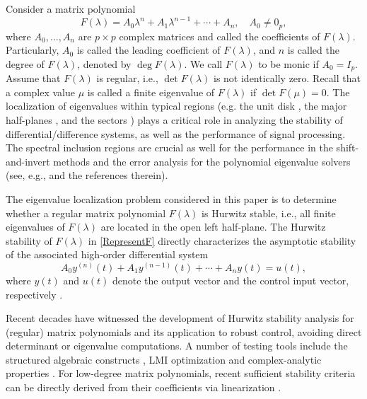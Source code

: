 \documentclass[12pt,reqno]{amsart}
\theoremstyle{plain}
\numberwithin{equation}{section}
\theoremstyle{remark}
\begin{document}
Consider a matrix polynomial 
\begin{equation}\label{RepresentF} 
F(\lambda)=A_{0} \lambda^{n}+A_{1} \lambda^{n-1}+\cdots+A_{n},\quad A_0\neq 0_p,
\end{equation}
where $A_0,\ldots, A_n$ are $p\times p$ complex matrices and called the coefficients of $F(\lambda)$. Particularly, $A_0$ is called the leading coefficient of $F(\lambda)$, and $n$ is called the degree of $F(\lambda)$, denoted by $\deg F(\lambda)$. We call $F(\lambda)$ to be monic 
if $A_0=I_p$. Assume that $F(\lambda)$ is regular, i.e., $\det F(\lambda)$ is not identically zero. 
Recall that a complex value $\mu$ is called a finite eigenvalue 
of $F(\lambda)$ if $\det F(\mu)=0$.  
The localization of eigenvalues within typical regions (e.g. the unit disk  \cite{DyV,LT82,SD}, the major half-planes \cite{CIK,NN,MMW,ZBH}, and the sectors \cite{Mat,MMW}) plays a critical role in analyzing the stability of differential/difference systems, as well as the performance of signal processing.
The spectral inclusion regions are crucial as well for the performance in the shift-and-invert methods and the error analysis for  the polynomial eigenvalue solvers (see, e.g., \cite{BH,RB,KG} and the references therein). 

The eigenvalue localization problem considered in this paper is to determine whether a regular matrix polynomial $F(\lambda)$ is Hurwitz stable, i.e., all finite eigenvalues of $F(\lambda)$ are located in the open left half-plane. The Hurwitz stability of $F(\lambda)$ in \eqref{RepresentF} directly characterizes the asymptotic stability of the associated high-order differential system
\begin{equation*}
A_{0} y^{(n)}(t)+A_{1} y^{(n-1)}(t)+\cdots+A_{n} y(t)=u(t),
\end{equation*} 
where $y(t)$ and $u(t)$ denote the output vector and the control input vector, respectively \cite{GLRMP}.

Recent decades have witnessed the development of Hurwitz stability analysis for (regular) matrix polynomials and its application to robust control, avoiding direct determinant or eigenvalue computations. A number of testing tools include the structured algebraic constructs \cite{CM,LRT,LT82,XD,Gal}, LMI optimization \cite{HAP,HAPS,LPJ} and complex-analytic properties \cite{BA,Hu,ZH}. For low-degree matrix polynomials, recent sufficient stability criteria can be directly derived from their coefficients via linearization \cite{MMW,RB}.
 
\end{document}
